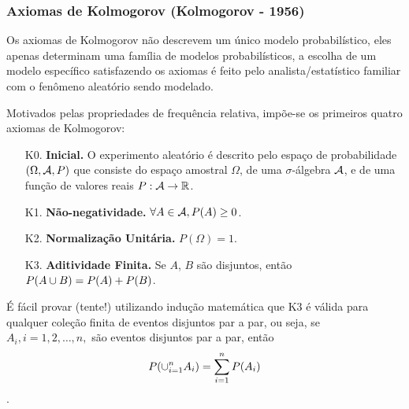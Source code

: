 \begin{frame}
\frametitle{Axiomas de Kolmogorov (Kolmogorov - 1956)}
	Os axiomas de Kolmogorov não descrevem um único modelo
	probabilístico, eles apenas determinam uma família de modelos
	probabilísticos, a escolha de um modelo específico satisfazendo os
	axiomas é feito pelo analista/estatístico familiar com o fenômeno
	aleatório sendo modelado.
	
	Motivados pelas propriedades de frequência relativa, impõe-se os
	primeiros quatro axiomas de Kolmogorov:
	
	\begin{enumerate}
		\item[K0.] {\bf Inicial.} O experimento aleatório é descrito pelo espaço de
		probabilidade $(\Omega,{\cal A},P)$ que consiste do espaço amostral
		$\Omega$, de uma $\sigma$-álgebra ${\cal A}$, e de uma função de valores
		reais $P:{\cal A}\rightarrow \mathbb{R}$.
		
		\item[K1.] {\bf Não-negatividade.} $\forall A\in{\cal A}, P(A)\geq 0$.
		
		\item[K2.] {\bf Normalização Unitária.} $P(\Omega)=1$.
		
		\item[K3.] {\bf Aditividade Finita.} Se $A$, $B$ são disjuntos,
		então $P(A\cup B)=P(A)+P(B)$.
	\end{enumerate}
É fácil provar (tente!) utilizando indução matemática que K3 é
válida para qualquer coleção finita de eventos disjuntos par a par,
ou seja, se $A_i,i=1,2,\ldots,n,$ são eventos disjuntos par a par,
então $$P(\cup_{i=1}^nA_i)=\sum_{i=1}^{n}P(A_i)$$.

\end{frame}


